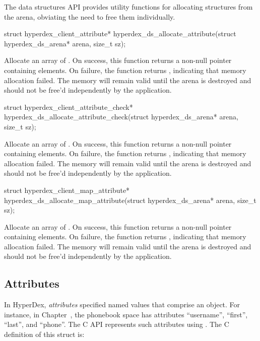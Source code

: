 The data structures API provides utility functions for allocating structures
from the arena, obviating the need to free them individually.

\begin{ccode}
struct hyperdex_client_attribute*
hyperdex_ds_allocate_attribute(struct hyperdex_ds_arena* arena, size_t sz);
\end{ccode}
Allocate an array of .  On
success, this function returns a non-null pointer containing  elements.
On failure, the function returns , indicating that memory allocation
failed.  The memory will remain valid until the arena is destroyed and should
not be free'd independently by the application.

\begin{ccode}
struct hyperdex_client_attribute_check*
hyperdex_ds_allocate_attribute_check(struct hyperdex_ds_arena* arena, size_t sz);
\end{ccode}
Allocate an array of .
On success, this function returns a non-null pointer containing 
elements.  On failure, the function returns , indicating that memory
allocation failed.  The memory will remain valid until the arena is destroyed
and should not be free'd independently by the application.

\begin{ccode}
struct hyperdex_client_map_attribute*
hyperdex_ds_allocate_map_attribute(struct hyperdex_ds_arena* arena, size_t sz);
\end{ccode}
Allocate an array of .
On success, this function returns a non-null pointer containing 
elements.  On failure, the function returns , indicating that memory
allocation failed.  The memory will remain valid until the arena is destroyed
and should not be free'd independently by the application.

\subsection{Attributes}
\label{sec:api:c:client:attributes}

In HyperDex, {\em attributes} specified named values that comprise an object.
For instance, in Chapter~, the phonebook space has
attributes ``username'', ``first'', ``last'', and ``phone''.  The C API
represents such attributes using .  The
C definition of this struct is:

